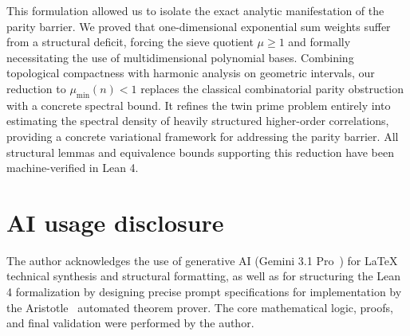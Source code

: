 \documentclass[reqno,notitlepage]{amsart}
\begin{document}
This formulation allowed us to isolate the exact analytic manifestation of the parity barrier. We
proved that one-dimensional exponential sum weights suffer from a structural deficit, forcing the
sieve quotient $\mu \ge 1$ and formally necessitating the use of multidimensional polynomial bases.
Combining topological compactness with harmonic analysis on geometric intervals, our reduction to
$\mu_{\min}(n) < 1$ replaces the classical combinatorial parity obstruction with a concrete spectral
bound. It refines the twin prime problem entirely into estimating the spectral density of heavily
structured higher-order correlations, providing a concrete variational framework for addressing the
parity barrier. All structural lemmas and equivalence bounds supporting this reduction have been
machine-verified in Lean 4.

\section*{AI usage disclosure}
The author acknowledges the use of generative AI (Gemini 3.1 Pro~\cite{geminiteam2025}) for LaTeX
technical synthesis and structural formatting, as well as for structuring the Lean 4 formalization
by designing precise prompt specifications for implementation by the Aristotle~\cite{Achim2025}
automated theorem prover. The core mathematical logic, proofs, and final validation were performed
by the author.



\end{document}
